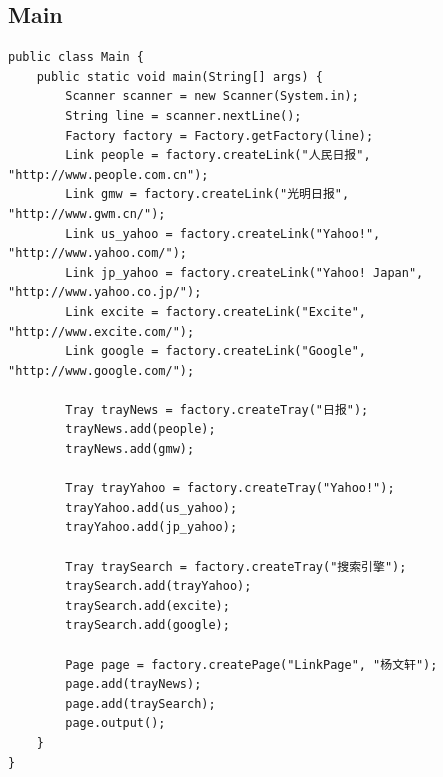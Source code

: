 \subsection{Main}
\begin{lstlisting}
public class Main {
	public static void main(String[] args) {
		Scanner scanner = new Scanner(System.in);
		String line = scanner.nextLine();
		Factory factory = Factory.getFactory(line);
		Link people = factory.createLink("人民日报", "http://www.people.com.cn");
		Link gmw = factory.createLink("光明日报", "http://www.gwm.cn/");
		Link us_yahoo = factory.createLink("Yahoo!", "http://www.yahoo.com/");
		Link jp_yahoo = factory.createLink("Yahoo! Japan", "http://www.yahoo.co.jp/");
		Link excite = factory.createLink("Excite", "http://www.excite.com/");
		Link google = factory.createLink("Google", "http://www.google.com/");
		
		Tray trayNews = factory.createTray("日报");
		trayNews.add(people);
		trayNews.add(gmw);
		
		Tray trayYahoo = factory.createTray("Yahoo!");
		trayYahoo.add(us_yahoo);
		trayYahoo.add(jp_yahoo);
		
		Tray traySearch = factory.createTray("搜索引擎");
		traySearch.add(trayYahoo);
		traySearch.add(excite);
		traySearch.add(google);
		
		Page page = factory.createPage("LinkPage", "杨文轩");
		page.add(trayNews);
		page.add(traySearch);
		page.output();
	}
}
\end{lstlisting}
